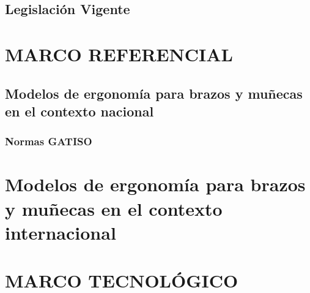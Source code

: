 \subsection{Legislación Vigente}
\section{MARCO REFERENCIAL}
\subsection{Modelos de ergonomía para brazos y muñecas en el contexto nacional}
\subsubsection{Normas GATISO}
\section{Modelos de ergonomía para brazos y muñecas en el contexto internacional}
\subsubsection{}
\section{MARCO TECNOLÓGICO}